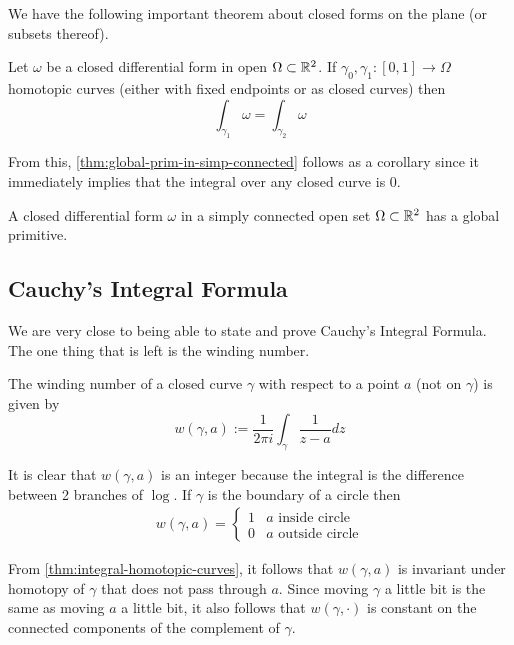 We have the following important theorem about closed forms on the plane (or subsets thereof). 
\begin{theorem}\label{thm:integral-homotopic-curves}
Let $\omega$ be a closed differential form in open $\Omega \subset \mathbb{R}^2$. If $\gamma_0, \gamma_1: [0, 1] \to \Omega$ homotopic curves (either with fixed endpoints or as closed curves) then
$$\int_{\gamma_1} \omega = \int_{\gamma_2} \omega$$
\end{theorem}

From this, \autoref{thm:global-prim-in-simp-connected} follows as a corollary since it immediately implies that the integral over any closed curve is 0.
\begin{theorem}\label{thm:global-prim-in-simp-connected}
    A closed differential form $\omega$ in a simply connected open set $\Omega \subset \mathbb{R}^2$ has a global primitive.
\end{theorem}

\subsection{Cauchy's Integral Formula}
We are very close to being able to state and prove Cauchy's Integral Formula. The one thing that is left is the winding number.
\begin{definition}
The winding number of a closed curve $\gamma$ with respect to a point $a$ (not on $\gamma$) is given by
$$w(\gamma, a) := \frac{1}{2\pi i} \int_\gamma \frac{1}{z - a}dz$$
\end{definition}

It is clear that $w(\gamma, a)$ is an integer because the integral is the difference between 2 branches of $\log$. If $\gamma$ is the boundary of a circle then
\begin{align*}
    w(\gamma, a) = 
    \begin{cases}
        1 & a \text{ inside circle}\\
        0 & a \text{ outside circle}
    \end{cases}
\end{align*}

From \autoref{thm:integral-homotopic-curves}, it follows that $w(\gamma, a)$ is invariant under homotopy of $\gamma$ that does not pass through $a$. Since moving $\gamma$ a little bit is the same as moving $a$ a little bit, it also follows that $w(\gamma, \cdot)$ is constant on the connected components of the complement of $\gamma$. 

